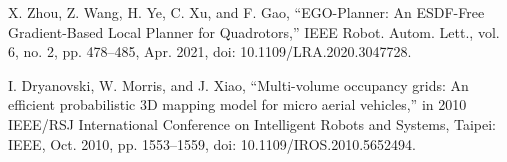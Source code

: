 \documentclass[letterpaper, 10 pt, conference]{ieeeconf}  %
\begin{document}
\begin{thebibliography}{99}
 X. Zhou, Z. Wang, H. Ye, C. Xu, and F. Gao, “EGO-Planner: An ESDF-Free Gradient-Based Local Planner for Quadrotors,” IEEE Robot. Autom. Lett., vol. 6, no. 2, pp. 478–485, Apr. 2021, doi: 10.1109/LRA.2020.3047728.

 I. Dryanovski, W. Morris, and J. Xiao, “Multi-volume occupancy grids: An efficient probabilistic 3D mapping model for micro aerial vehicles,” in 2010 IEEE/RSJ International Conference on Intelligent Robots and Systems, Taipei: IEEE, Oct. 2010, pp. 1553–1559, doi: 10.1109/IROS.2010.5652494.



\end{thebibliography}
\end{document}

